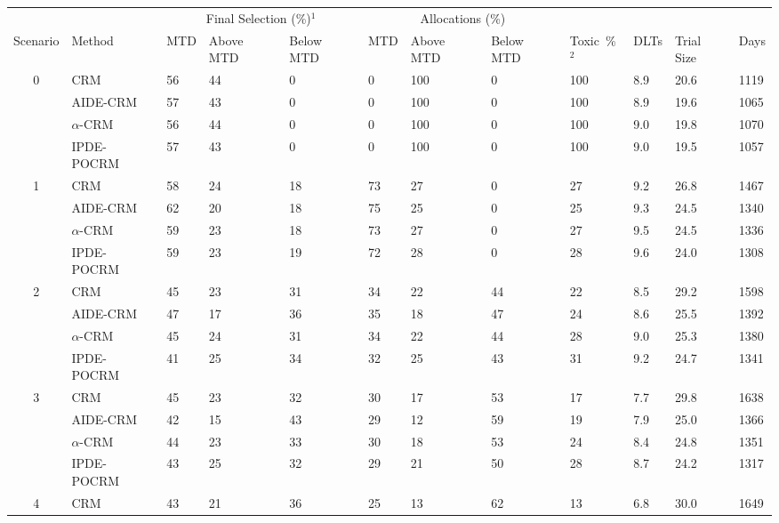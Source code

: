 \begin{tabular*}{\textwidth}{@{\extracolsep\fill}clllllllllll@{\extracolsep\fill}}
\toprule
&  & \multicolumn{3}{c}{Final Selection (\%)$^1$} & \multicolumn{3}{c}{Allocations (\%)} & &  &  &  \\
\multirow{2}{2em}{Scenario} & \multirow{2}{2em}{Method} & \multirow{2}{2em}{MTD} & \multirow{2}{2em}{Above MTD} & \multirow{2}{2em}{Below MTD} & \multirow{2}{2em}{MTD} & \multirow{2}{2em}{Above MTD} & \multirow{2}{2em}{Below MTD} & \multirow{2}{2em}{Toxic~\%$^2$} & \multirow{2}{2em}{DLTs} & \multirow{2}{2em}{Trial Size} & \multirow{2}{2em}{Days}  \\ \\ 
\midrule
\multirow{4}{2em}{0} & CRM & 56 & 44 & 0 & 0 & 100 & 0 & 100 & 8.9 & 20.6 & 1119\\
 & AIDE-CRM & 57 & 43 & 0 & 0 & 100 & 0 & 100 & 8.9 & 19.6 & 1065\\
 & $\alpha$-CRM & 56 & 44 & 0 & 0 & 100 & 0 & 100 & 9.0 & 19.8 & 1070\\
 & IPDE-POCRM & 57 & 43 & 0 & 0 & 100 & 0 & 100 & 9.0 & 19.5 & 1057\\
\midrule
\multirow{4}{2em}{1} & CRM & 58 & 24 & 18 & 73 & 27 & 0 & 27 & 9.2 & 26.8 & 1467\\
 & AIDE-CRM & 62 & 20 & 18 & 75 & 25 & 0 & 25 & 9.3 & 24.5 & 1340\\
 & $\alpha$-CRM & 59 & 23 & 18 & 73 & 27 & 0 & 27 & 9.5 & 24.5 & 1336\\
 & IPDE-POCRM & 59 & 23 & 19 & 72 & 28 & 0 & 28 & 9.6 & 24.0 & 1308\\
\midrule
\multirow{4}{2em}{2} & CRM & 45 & 23 & 31 & 34 & 22 & 44 & 22 & 8.5 & 29.2 & 1598\\
 & AIDE-CRM & 47 & 17 & 36 & 35 & 18 & 47 & 24 & 8.6 & 25.5 & 1392\\
 & $\alpha$-CRM & 45 & 24 & 31 & 34 & 22 & 44 & 28 & 9.0 & 25.3 & 1380\\
 & IPDE-POCRM & 41 & 25 & 34 & 32 & 25 & 43 & 31 & 9.2 & 24.7 & 1341\\
\midrule
\multirow{4}{2em}{3} & CRM & 45 & 23 & 32 & 30 & 17 & 53 & 17 & 7.7 & 29.8 & 1638\\
 & AIDE-CRM & 42 & 15 & 43 & 29 & 12 & 59 & 19 & 7.9 & 25.0 & 1366\\
 & $\alpha$-CRM & 44 & 23 & 33 & 30 & 18 & 53 & 24 & 8.4 & 24.8 & 1351\\
 & IPDE-POCRM & 43 & 25 & 32 & 29 & 21 & 50 & 28 & 8.7 & 24.2 & 1317\\
\midrule
\multirow{4}{2em}{4} & CRM & 43 & 21 & 36 & 25 & 13 & 62 & 13 & 6.8 & 30.0 & 1649\\

\end{tabular*}
